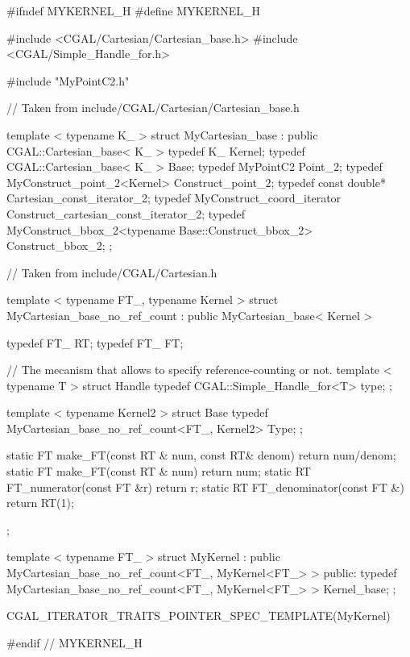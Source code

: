 \ccHtmlLinksOff
\begin{ccExampleCode}
#ifndef MYKERNEL_H
#define MYKERNEL_H

#include <CGAL/Cartesian/Cartesian_base.h>
#include <CGAL/Simple_Handle_for.h>


#include "MyPointC2.h"

// Taken from include/CGAL/Cartesian/Cartesian_base.h

template < typename K_ >
struct MyCartesian_base : public CGAL::Cartesian_base< K_ >
{
  typedef K_                                Kernel;
  typedef CGAL::Cartesian_base< K_ >        Base;
  typedef MyPointC2                         Point_2;
  typedef MyConstruct_point_2<Kernel>       Construct_point_2;
  typedef const double*                     Cartesian_const_iterator_2;
  typedef MyConstruct_coord_iterator        Construct_cartesian_const_iterator_2;
  typedef MyConstruct_bbox_2<typename Base::Construct_bbox_2> 
                                            Construct_bbox_2;
};


// Taken from include/CGAL/Cartesian.h

template < typename FT_, typename Kernel >
struct MyCartesian_base_no_ref_count
  : public MyCartesian_base< Kernel >
{
    typedef FT_                                           RT;
    typedef FT_                                           FT;

    // The mecanism that allows to specify reference-counting or not.
    template < typename T >
    struct Handle { typedef CGAL::Simple_Handle_for<T>   type; };

    template < typename Kernel2 >
    struct Base { typedef MyCartesian_base_no_ref_count<FT_, Kernel2>  Type; };

    static   FT make_FT(const RT & num, const RT& denom) { return num/denom;}
    static   FT make_FT(const RT & num)                  { return num;}
    static   RT FT_numerator(const FT &r)                { return r;}
    static   RT FT_denominator(const FT &)               { return RT(1);}
};

template < typename FT_ >
struct MyKernel
  : public MyCartesian_base_no_ref_count<FT_, MyKernel<FT_> >
{
public:
  typedef MyCartesian_base_no_ref_count<FT_, MyKernel<FT_> > Kernel_base;
};

CGAL_ITERATOR_TRAITS_POINTER_SPEC_TEMPLATE(MyKernel)

#endif // MYKERNEL_H

\end{ccExampleCode}
\ccHtmlLinksOn



